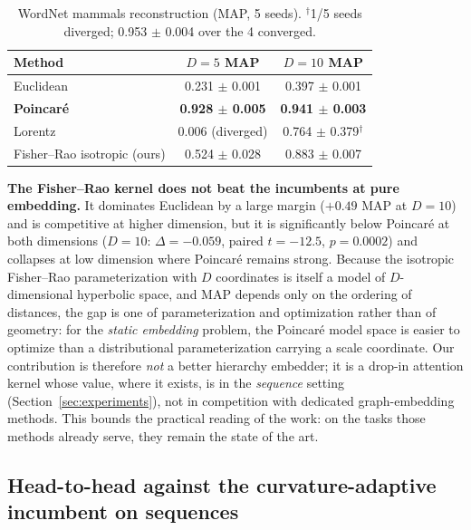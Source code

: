 \documentclass[11pt]{article}
\begin{document}
\begin{table}[h]
\centering\small
\begin{tabular}{lcc}
\toprule
Method & $D=5$ MAP & $D=10$ MAP \\
\midrule
Euclidean & 0.231 $\pm$ 0.001 & 0.397 $\pm$ 0.001 \\
\textbf{Poincar\'e \cite{nickel2017}} & \textbf{0.928 $\pm$ 0.005} & \textbf{0.941 $\pm$ 0.003} \\
Lorentz \cite{nickel2018lorentz} & 0.006 (diverged) & 0.764 $\pm$ 0.379$^{\dagger}$ \\
Fisher--Rao isotropic (ours) & 0.524 $\pm$ 0.028 & 0.883 $\pm$ 0.007 \\
\bottomrule
\end{tabular}
\caption{WordNet mammals reconstruction (MAP, 5 seeds). $^{\dagger}$1/5 seeds diverged; 0.953 $\pm$ 0.004 over the 4 converged.}
\label{tab:wordnet}
\end{table}

\textbf{The Fisher--Rao kernel does not beat the incumbents at pure embedding.} It dominates Euclidean by a large margin ($+0.49$ MAP at $D=10$) and is competitive at higher dimension, but it is significantly below Poincar\'e at both dimensions ($D=10$: $\Delta = -0.059$, paired $t = -12.5$, $p = 0.0002$) and collapses at low dimension where Poincar\'e remains strong. Because the isotropic Fisher--Rao parameterization with $D$ coordinates is itself a model of $D$-dimensional hyperbolic space, and MAP depends only on the ordering of distances, the gap is one of parameterization and optimization rather than of geometry: for the \emph{static embedding} problem, the Poincar\'e model space is easier to optimize than a distributional parameterization carrying a scale coordinate. Our contribution is therefore \emph{not} a better hierarchy embedder; it is a drop-in attention kernel whose value, where it exists, is in the \emph{sequence} setting (Section~\ref{sec:experiments}), not in competition with dedicated graph-embedding methods. This bounds the practical reading of the work: on the tasks those methods already serve, they remain the state of the art.

\subsection{Head-to-head against the curvature-adaptive incumbent on sequences}\label{sec:cat}
\end{document}
